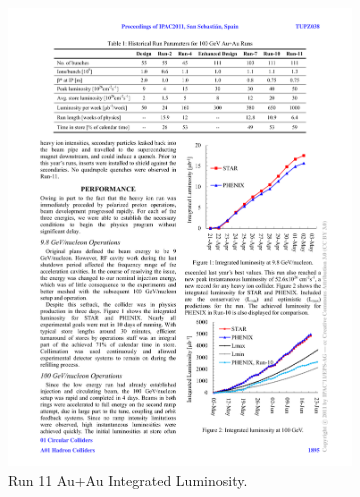 \begin{figure}[htbp]
    \begin{subfigure}{0.5\textwidth}
        \includegraphics[width=\textwidth]{Plots/NPE/Run11_Lum.pdf}
        \caption{Run 11 Au+Au Integrated Luminosity.}
        \label{fig:Luma}
    \end{subfigure}
    \begin{subfigure}{0.5\textwidth}

\end{subfigure}
\end{figure}
